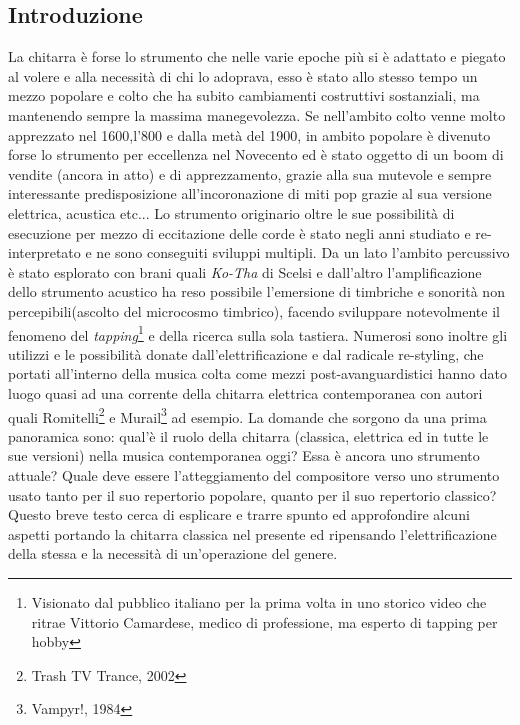 \documentclass[oneside]{article}
\begin{document}
\newpage
\begin{multicols*}{2} %



\section{ Introduzione}

La chitarra è forse lo strumento che nelle varie epoche più si è adattato e piegato al volere e alla necessità di chi lo adoprava, esso è stato allo stesso tempo un mezzo popolare e colto che ha subito cambiamenti costruttivi sostanziali, ma mantenendo sempre la massima manegevolezza. Se nell’ambito colto venne molto apprezzato nel 1600,l’800 e dalla metà del 1900, in ambito popolare è divenuto forse lo strumento per eccellenza nel Novecento ed è stato oggetto di un boom di vendite (ancora in atto) e di apprezzamento, grazie alla sua mutevole e sempre interessante predisposizione all’incoronazione di miti pop grazie al sua versione elettrica, acustica etc... Lo strumento originario oltre le sue possibilità di esecuzione per mezzo di eccitazione delle corde è stato negli anni studiato e re-interpretato e ne sono conseguiti sviluppi multipli. Da un lato l’ambito percussivo è stato esplorato con brani quali \textit{Ko-Tha} di Scelsi e dall’altro l’amplificazione dello strumento acustico ha reso possibile l’emersione di timbriche e sonorità non percepibili(ascolto del microcosmo timbrico), facendo sviluppare notevolmente il fenomeno del \textit{tapping}\footnote{Visionato dal pubblico italiano per la prima volta in uno storico video che ritrae Vittorio Camardese, medico di professione, ma esperto di tapping per hobby} e della ricerca sulla sola tastiera. Numerosi sono inoltre gli utilizzi e le possibilità donate dall’elettrificazione e dal radicale re-styling, che portati all’interno della musica colta come mezzi post-avanguardistici hanno dato luogo quasi ad una corrente della chitarra elettrica contemporanea con autori quali Romitelli\footnote{Trash TV Trance, 2002}  e Murail\footnote{Vampyr!, 1984}  ad esempio. 
La domande che sorgono da una prima panoramica sono: qual’è il ruolo della chitarra (classica, elettrica ed in tutte le sue versioni) nella musica contemporanea oggi? Essa è ancora uno strumento attuale? Quale deve essere l’atteggiamento del compositore verso uno strumento usato tanto per il suo repertorio popolare, quanto per il suo repertorio classico? Questo breve testo cerca di esplicare e trarre spunto ed approfondire alcuni aspetti portando la chitarra classica nel presente ed ripensando l’elettrificazione della stessa e la necessità di un’operazione del genere. 



\end{multicols*}
\end{document}
